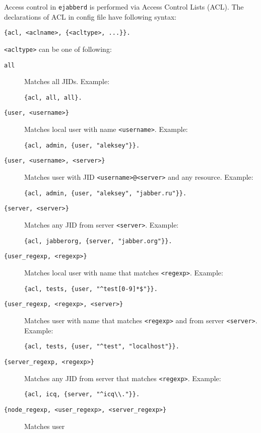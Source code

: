 \documentclass[10pt]{article}
\newcommand{\ejabberd}{\texttt{ejabberd}}
\begin{document}
Access control in \ejabberd{} is performed via Access Control Lists (ACL).  The
declarations of ACL in config file have following syntax:
\begin{verbatim}
{acl, <aclname>, {<acltype>, ...}}.
\end{verbatim}

\texttt{<acltype>} can be one of following:
\begin{description}
\item[\texttt{all}] Matches all JIDs.  Example:
\begin{verbatim}
{acl, all, all}.
\end{verbatim}
\item[\texttt{\{user, <username>\}}] Matches local user with name
  \texttt{<username>}.  Example:
\begin{verbatim}
{acl, admin, {user, "aleksey"}}.
\end{verbatim}
\item[\texttt{\{user, <username>, <server>\}}] Matches user with JID
  \texttt{<username>@<server>} and any resource.  Example:
\begin{verbatim}
{acl, admin, {user, "aleksey", "jabber.ru"}}.
\end{verbatim}
\item[\texttt{\{server, <server>\}}] Matches any JID from server
  \texttt{<server>}.  Example:
\begin{verbatim}
{acl, jabberorg, {server, "jabber.org"}}.
\end{verbatim}
\item[\texttt{\{user\_regexp, <regexp>\}}] Matches local user with name that
  matches \texttt{<regexp>}.  Example:
\begin{verbatim}
{acl, tests, {user, "^test[0-9]*$"}}.
\end{verbatim}
\item[\texttt{\{user\_regexp, <regexp>, <server>\}}] Matches user with name
  that matches \texttt{<regexp>} and from server \texttt{<server>}.  Example:
\begin{verbatim}
{acl, tests, {user, "^test", "localhost"}}.
\end{verbatim}
\item[\texttt{\{server\_regexp, <regexp>\}}] Matches any JID from server that
  matches \texttt{<regexp>}.  Example:
\begin{verbatim}
{acl, icq, {server, "^icq\\."}}.
\end{verbatim}
\item[\texttt{\{node\_regexp, <user\_regexp>, <server\_regexp>\}}] Matches user

\end{description}
\end{document}
